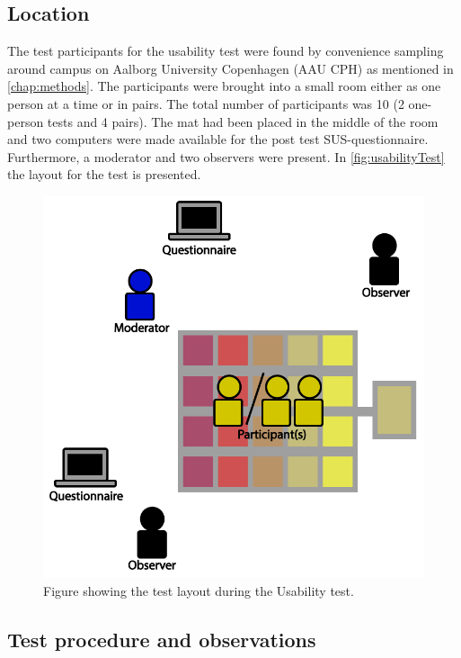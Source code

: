 \subsection{Location}
The test participants for the usability test were found by convenience sampling around campus on Aalborg University Copenhagen (AAU CPH) as mentioned in \ref{chap:methods}. The participants were brought into a small room either as one person at a time or in pairs. The total number of participants was 10 (2 one-person tests and 4 pairs). The mat had been placed in the middle of the room and two computers were made available for the post test SUS-questionnaire. Furthermore, a moderator and two observers were present. In \autoref{fig:usabilityTest} the layout for the test is presented.

\begin{figure}[H]
	\centering
	\includegraphics[width=0.7\linewidth]{figure/Design/usability}
	\caption{Figure showing the test layout during the Usability test.}	
	\label{fig:usabilityTest}
\end{figure}

\subsection{Test procedure and observations}

